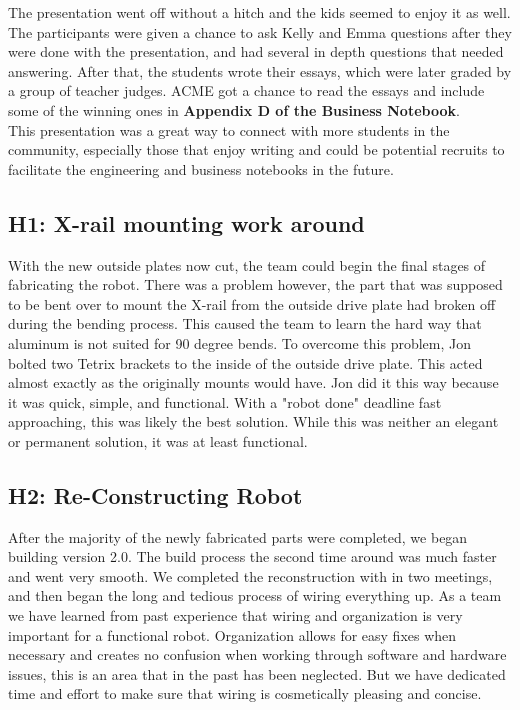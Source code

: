 \documentclass{article}
\begin{document}
The presentation went off without a hitch and the kids seemed to enjoy it as well. The participants were given a chance to ask Kelly and Emma questions after they were done with the presentation, and had several in depth questions that needed answering. After that, the students wrote their essays, which were later graded by a group of teacher judges. ACME got a chance to read the essays and include some of the winning ones in \textbf{Appendix D of the Business Notebook}. \\

This presentation was a great way to connect with more students in the community, especially those that enjoy writing and could be potential recruits to facilitate the engineering and business notebooks in the future. \\


\subsection{H1: X-rail mounting work around}

With the new outside plates now cut, the team could begin the final stages of fabricating the robot. There was a problem however, the part that was supposed to be bent over to mount the X-rail from the outside drive plate had broken off during the bending process. This caused the team to learn the hard way that aluminum is not suited for 90 degree bends. To overcome this problem, Jon bolted two Tetrix brackets to the inside of the outside drive plate. This acted almost exactly as the originally mounts would have. Jon did it this way because it was quick, simple, and functional. With a "robot done" deadline fast approaching, this was likely the best solution. While this was neither an elegant or permanent solution, it was at least functional.

\subsection{H2: Re-Constructing Robot}

After the majority of the newly fabricated parts were completed, we began building version 2.0. The build process the second time around was much faster and went very smooth. We completed the reconstruction with in two meetings, and then began the long and tedious process of wiring everything up. As a team we have learned from past experience that wiring and organization is very important for a functional robot. Organization allows for easy fixes when necessary and creates no confusion when working through software and hardware issues, this is an area that in the past has been neglected. But we have dedicated time and effort to make sure that wiring is cosmetically pleasing and concise. 
\end{document}
